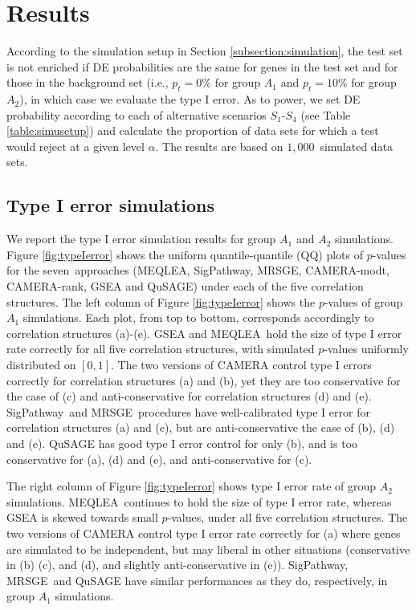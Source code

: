 \documentclass[useAMS,usenatbib, galley]{biom}
\newcommand{\OurMethod}{MEQLEA}
\newcommand{\aaCase}{a}
\newcommand{\aCase}{b}
\newcommand{\cCase}{c}
\newcommand{\eCase}{d}
\newcommand{\fCase}{e}
\newcommand{\CMR}{CAMERA-rank}
\newcommand{\CMT}{CAMERA-modt}
\newcommand{\gent}{SigPathway}
\newcommand{\genr}{MRSGE}
\newcommand{\HowmanySimu}{$1,000$}
\begin{document}
	
	\section{Results}\label{section:results}
	
	According to the simulation setup in Section \ref{subsection:simulation}, the test set is not enriched if DE probabilities are the same for genes in the test set and for those in the background set (i.e., $p_t =0\%$ for group $A_1$ and $p_t = 10\%$ for group $A_2$), in which case we evaluate the type I error. As to power, we set DE probability according to each of alternative scenarios $S_1$-$S_4$ (see Table \ref{table:simusetup}) and calculate the proportion of data sets for which a test would reject at a given level $\alpha$. The results are based on \HowmanySimu~simulated data sets. 
		
		

	\subsection{Type I error simulations}\label{subsection:typeIerror}

	We report the type I error simulation results for group $A_1$ and $A_2$ simulations. Figure \ref{fig:typeIerror} shows the uniform quantile-quantile (QQ) plots of $p$-values for the seven~approaches (\OurMethod, \gent, \genr, \CMT, \CMR, GSEA and QuSAGE) under each of the five correlation structures. The left column of Figure \ref{fig:typeIerror} shows the $p$-values of group $A_1$ simulations. Each plot, from top to bottom, corresponds accordingly to correlation structures (\aaCase)-(\fCase). GSEA and \OurMethod~hold the size of type I error rate correctly for all five correlation structures, with simulated $p$-values uniformly distributed on $[0, 1]$. The two versions of CAMERA control type I errors correctly for correlation structures (\aaCase) and (\aCase), yet they are too conservative for the case of (\cCase) and anti-conservative for correlation structures (\eCase) and (\fCase). \gent~and \genr~procedures have well-calibrated type I error for correlation structures (\aaCase) and (\cCase), but are anti-conservative the case of (\aCase), (\eCase) and (\fCase). QuSAGE has good type I error control for only (\aCase), and is too conservative for (\aaCase), (\eCase) and (\fCase), and anti-conservative for (\cCase).
	
	The right column of Figure \ref{fig:typeIerror} shows type I error rate of group $A_2$ simulations. \OurMethod~continues to hold the size of type I error rate, whereas GSEA is skewed towards small $p$-values, under all five correlation structures. The two versions of CAMERA control type I error rate correctly for (\aaCase) where genes are simulated to be independent, but may liberal in other situations (conservative in (\aCase) (\cCase), and (\eCase), and slightly anti-conservative in (\fCase)). \gent, \genr~and QuSAGE have similar performances as they do, respectively, in group $A_1$ simulations.
	
\end{document}
